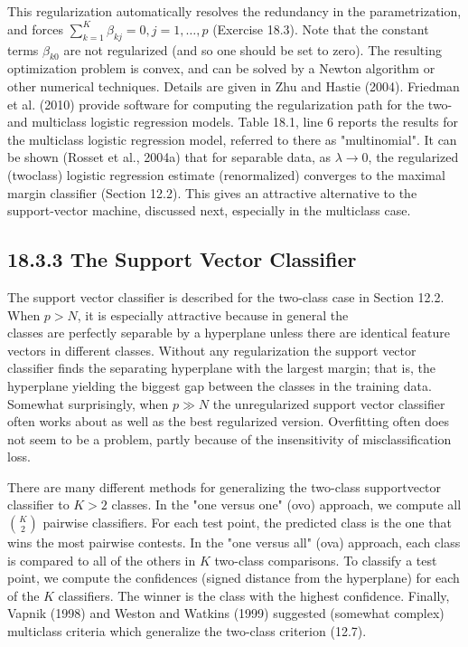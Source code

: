 \documentclass[10pt]{article}
\begin{document}
This regularization automatically resolves the redundancy in the parametrization, and forces $\sum_{k=1}^{K} \hat{\beta}_{k j}=0, j=1, \ldots, p$ (Exercise 18.3). Note that the constant terms $\beta_{k 0}$ are not regularized (and so one should be set to zero). The resulting optimization problem is convex, and can be solved by a Newton algorithm or other numerical techniques. Details are given in Zhu and Hastie (2004). Friedman et al. (2010) provide software for computing the regularization path for the two- and multiclass logistic regression models. Table 18.1, line 6 reports the results for the multiclass logistic regression model, referred to there as "multinomial". It can be shown (Rosset et al., 2004a) that for separable data, as $\lambda \rightarrow 0$, the regularized (twoclass) logistic regression estimate (renormalized) converges to the maximal margin classifier (Section 12.2). This gives an attractive alternative to the support-vector machine, discussed next, especially in the multiclass case.

\subsection*{18.3.3 The Support Vector Classifier}
The support vector classifier is described for the two-class case in Section 12.2. When $p>N$, it is especially attractive because in general the\\
classes are perfectly separable by a hyperplane unless there are identical feature vectors in different classes. Without any regularization the support vector classifier finds the separating hyperplane with the largest margin; that is, the hyperplane yielding the biggest gap between the classes in the training data. Somewhat surprisingly, when $p \gg N$ the unregularized support vector classifier often works about as well as the best regularized version. Overfitting often does not seem to be a problem, partly because of the insensitivity of misclassification loss.

There are many different methods for generalizing the two-class supportvector classifier to $K>2$ classes. In the "one versus one" (ovo) approach, we compute all $\binom{K}{2}$ pairwise classifiers. For each test point, the predicted class is the one that wins the most pairwise contests. In the "one versus all" (ova) approach, each class is compared to all of the others in $K$ two-class comparisons. To classify a test point, we compute the confidences (signed distance from the hyperplane) for each of the $K$ classifiers. The winner is the class with the highest confidence. Finally, Vapnik (1998) and Weston and Watkins (1999) suggested (somewhat complex) multiclass criteria which generalize the two-class criterion (12.7).
\end{document}
